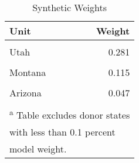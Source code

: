 \begin{table}[H]

\caption{\label{tab:unit_weight_table_washington}Synthetic Weights}
\centering
\begin{tabular}[t]{lr}
\toprule
Unit & Weight\\
\midrule
\cellcolor{gray!6}{Florida} & \cellcolor{gray!6}{0.282}\\
Utah & 0.281\\
\cellcolor{gray!6}{Connecticut} & \cellcolor{gray!6}{0.212}\\
Montana & 0.115\\
\cellcolor{gray!6}{Hawaii} & \cellcolor{gray!6}{0.048}\\
\addlinespace
Arizona & 0.047\\
\cellcolor{gray!6}{District of Columbia} & \cellcolor{gray!6}{0.015}\\
\bottomrule
\multicolumn{2}{l}{\textsuperscript{a} Table excludes donor states}\\
\multicolumn{2}{l}{with less than 0.1 percent}\\
\multicolumn{2}{l}{model weight.}\\
\end{tabular}
\end{table}
